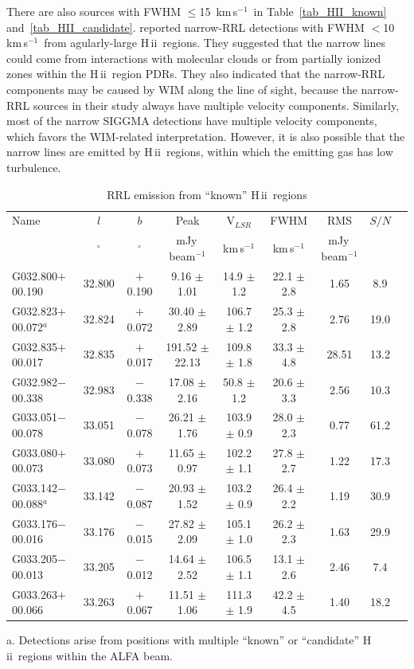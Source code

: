 \documentclass[manuscript]{aastex61}
\newcommand{\hii}{{\rm H\,}{{\sc ii}}}
\newcommand{\kms}{\,km\,s$^{-1}$}
\begin{document}
There are also sources with FWHM $\leq$15 \kms\ in Table~\ref{tab_HII_known} and~\ref{tab_HII_candidate}.
\citet{Anderson2018} reported narrow-RRL detections with FWHM $<$10 \kms\ from agularly-large \hii\ regions.
They suggested that the narrow lines could come from interactions with molecular clouds or from partially ionized zones within the \hii\ region PDRs.
They also indicated that the narrow-RRL components may be caused by WIM along the line of sight, because the narrow-RRL sources in their study always have multiple velocity components.
Similarly, most of the narrow SIGGMA detections have multiple velocity components, which favors the WIM-related interpretation.
However, it is also possible that the narrow lines are emitted by \hii\ regions, within which the emitting gas has low turbulence.

\begin{table}[htbp]
\centering
\caption{RRL emission from ``known'' \hii\ regions}\label{tab_hii_k_sample}
\begin{threeparttable}
\begin{tabular*}{\textwidth}{l@{\extracolsep{\fill}}*{8}{c}}
\hline
\hline
Name & $l$ & $b$ & Peak& V$_{LSR}$& FWHM& RMS& $S/N$\\
&$^\circ$&$^\circ$&mJy\,beam$^{-1}$&km\,s$^{-1}$&km\,s$^{-1}$&mJy\,beam$^{-1}$& \\
\hline
G032.800$+$00.190     &32.800&	$+$0.190	&9.16	$\pm$ 1.01	&14.9	$\pm$ 1.2	&22.1	$\pm$ 2.8	&1.65	&8.9 \\ 
G032.823$+$00.072$^a$ &32.824&	$+$0.072	&30.40	$\pm$ 2.89	&106.7	$\pm$ 1.2	&25.3	$\pm$ 2.8	&2.76	&19.0\\
G032.835$+$00.017     &32.835&	$+$0.017	&191.52	$\pm$ 22.13	&109.8	$\pm$ 1.8	&33.3	$\pm$ 4.8	&28.51	&13.2\\
G032.982$-$00.338     &32.983&	$-$0.338	&17.08	$\pm$ 2.16	&50.8	$\pm$ 1.2	&20.6	$\pm$ 3.3	&2.56	&10.3\\
G033.051$-$00.078     &33.051&	$-$0.078	&26.21	$\pm$ 1.76	&103.9	$\pm$ 0.9	&28.0	$\pm$ 2.3	&0.77	&61.2\\
G033.080$+$00.073     &33.080&	$+$0.073	&11.65	$\pm$ 0.97	&102.2	$\pm$ 1.1	&27.8	$\pm$ 2.7	&1.22	&17.3\\
G033.142$-$00.088$^a$ &33.142&	$-$0.087	&20.93	$\pm$ 1.52	&103.2	$\pm$ 0.9	&26.4	$\pm$ 2.2	&1.19	&30.9\\
G033.176$-$00.016     &33.176&	$-$0.015	&27.82	$\pm$ 2.09	&105.1	$\pm$ 1.0	&26.2	$\pm$ 2.3	&1.63	&29.9\\
G033.205$-$00.013     &33.205&	$-$0.012	&14.64	$\pm$ 2.52	&106.5	$\pm$ 1.1	&13.1	$\pm$ 2.6	&2.46	&7.4\\
G033.263$+$00.066     &33.263&	$+$0.067	&11.51	$\pm$ 1.06	&111.3	$\pm$ 1.9	&42.2	$\pm$ 4.5	&1.40	&18.2\\
\hline
\end{tabular*}
\begin{tablenotes}
      \small
      \item a. Detections arise from positions with multiple ``known'' or ``candidate'' \hii\ regions within the ALFA beam.
\end{tablenotes}
\end{threeparttable}
\end{table}
\end{document}
